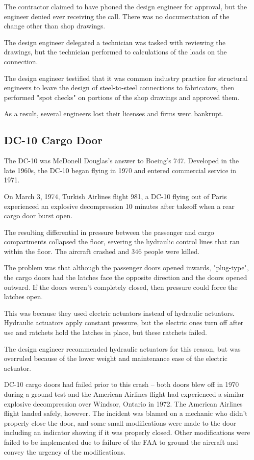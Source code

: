 \documentclass{article}
\begin{document}
The contractor claimed to have phoned the design engineer for approval, but the engineer denied ever receiving the call. There was no documentation of the change other than shop drawings.

The design engineer delegated a technician was tasked with reviewing the drawings, but the technician performed to calculations of the loads on the connection. 

The design engineer testified that it was common industry practice for structural engineers to leave the design of steel-to-steel connections to fabricators, then performed "spot checks" on portions of the shop drawings and approved them.

As a result, several engineers lost their licenses and firms went bankrupt.

\subsection{DC-10 Cargo Door}

The DC-10 was McDonell Douglas's answer to Boeing's 747. Developed in the late 1960s, the DC-10 began flying in 1970 and entered commercial service in 1971.

On March 3, 1974, Turkish Airlines flight 981, a DC-10 flying out of Paris experienced an explosive decompression 10 minutes after takeoff when a rear cargo door burst open.

The resulting differential in pressure between the passenger and cargo compartments collapsed the floor, severing the hydraulic control lines that ran within the floor. The aircraft crashed and 346 people were killed.


The problem was that although the passenger doors opened inwards, "plug-type", the cargo doors had the latches face the opposite direction and the doors opened outward. If the doors weren't completely closed, then pressure could force the latches open.

This was because they used electric actuators instead of hydraulic actuators. Hydraulic actuators apply constant pressure, but the electric ones turn off after use and ratchets hold the latches in place, but these ratchets failed.

The design engineer recommended hydraulic actuators for this reason, but was overruled because of the lower weight and maintenance ease of the electric actuator.

DC-10 cargo doors had failed prior to this crash – both doors blew off in 1970 during a ground test and the American Airlines flight had experienced a similar explosive decompression over Windsor, Ontario in 1972. The American Airlines flight landed safely, however. The incident was blamed on a mechanic who didn't properly close the door, and some small modifications were made to the door including an indicator showing if it was properly closed. Other modifications were failed to be implemented due to failure of the FAA to ground the aircraft and convey the urgency of the modifications.
\end{document}
